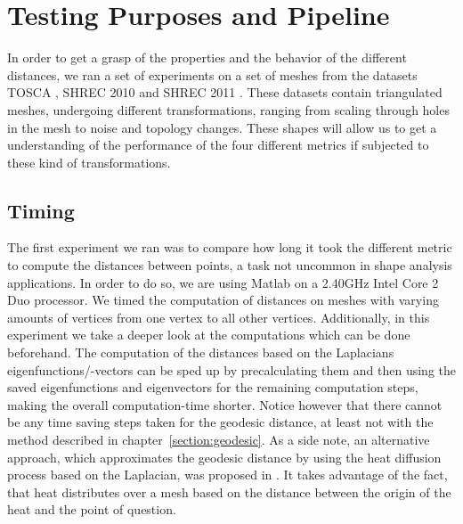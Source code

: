 \chapter{Testing Purposes and Pipeline}
\label{chapter:testing}


In order to get a grasp of the properties and the behavior of the different distances, we ran a set of experiments on a set of meshes from the datasets TOSCA \cite{bronstein2008numerical}, SHREC 2010 \cite{bronstein2010shrec} and SHREC 2011 \cite{dutagaci2011shrec}.
These datasets contain triangulated meshes, undergoing different transformations, ranging from scaling through holes in the mesh to noise and topology changes.
These shapes will allow us to get a understanding of the performance of the four different metrics if subjected to these kind of transformations.

\section{Timing}

The first experiment we ran was to compare how long it took the different metric to compute the distances between points, a task not uncommon in shape analysis applications.
In order to do so, we are using Matlab on a 2.40GHz Intel Core 2 Duo processor.
We timed the computation of distances on meshes with varying amounts of vertices from one vertex to all other vertices.
Additionally, in this experiment we take a deeper look at the computations which can be done beforehand.
The computation of the distances based on the Laplacians eigenfunctions/-vectors can be sped up by precalculating them and then using the saved eigenfunctions and eigenvectors for the remaining computation steps, making the overall computation-time shorter.
Notice however that there cannot be any time saving steps taken for the geodesic distance, at least not with the method described in chapter~\ref{section:geodesic}.
As a side note, an alternative approach, which approximates the geodesic distance by using the heat diffusion process based on the Laplacian, was proposed in \cite{crane2013geodesics}.
It takes advantage of the fact, that heat distributes over a mesh based on the distance between the origin of the heat and the point of question.

